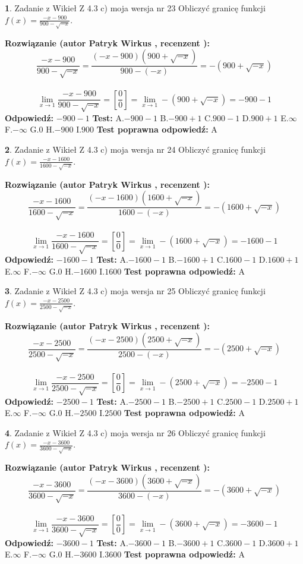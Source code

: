 \documentclass[12pt, a4paper]{article}
\theoremstyle{definition} %
\newtheorem{zad}{}
\newcommand{\zadStart}[1]{\begin{zad}#1\newline}
\newcommand{\zadStop}{\end{zad}}
\newcommand{\rozwStart}[2]{\noindent \textbf{Rozwiązanie (autor #1 , recenzent #2): }\newline}
\newcommand{\rozwStop}{\newline}
\newcommand{\odpStart}{\noindent \textbf{Odpowiedź:}\newline}
\newcommand{\odpStop}{\newline}
\newcommand{\testStart}{\noindent \textbf{Test:}\newline}
\newcommand{\testStop}{\newline}
\newcommand{\kluczStart}{\noindent \textbf{Test poprawna odpowiedź:}\newline}
\newcommand{\kluczStop}{\newline}
\begin{document}
\zadStart{Zadanie z Wikieł Z 4.3 c) moja wersja nr 23}
Obliczyć granicę funkcji $f(x)=\frac{-x-900}{900-\sqrt{-x}}$.
\zadStop
\rozwStart{Patryk Wirkus}{}
$$\frac{-x-900}{900-\sqrt{-x}}=\frac{(-x-900)(900+\sqrt{-x})}{900-(-x)}=-(900+\sqrt{-x})$$
\\
$$\lim\limits_{x\to1}\frac{-x-900}{900-\sqrt{-x}}=[\frac{0}{0}]=\lim\limits_{x\to1}-(900+\sqrt{-x}) =-900-1$$
\rozwStop
\odpStart
$-900-1$
\odpStop
\testStart
A.$-900-1$
B.$-900+1$
C.$900-1$
D.$900+1$
E.$\infty$
F.$-\infty$
G.$0$
H.$-900$
I.$900$
\testStop
\kluczStart
A
\kluczStop



\zadStart{Zadanie z Wikieł Z 4.3 c) moja wersja nr 24}
Obliczyć granicę funkcji $f(x)=\frac{-x-1600}{1600-\sqrt{-x}}$.
\zadStop
\rozwStart{Patryk Wirkus}{}
$$\frac{-x-1600}{1600-\sqrt{-x}}=\frac{(-x-1600)(1600+\sqrt{-x})}{1600-(-x)}=-(1600+\sqrt{-x})$$
\\
$$\lim\limits_{x\to1}\frac{-x-1600}{1600-\sqrt{-x}}=[\frac{0}{0}]=\lim\limits_{x\to1}-(1600+\sqrt{-x}) =-1600-1$$
\rozwStop
\odpStart
$-1600-1$
\odpStop
\testStart
A.$-1600-1$
B.$-1600+1$
C.$1600-1$
D.$1600+1$
E.$\infty$
F.$-\infty$
G.$0$
H.$-1600$
I.$1600$
\testStop
\kluczStart
A
\kluczStop



\zadStart{Zadanie z Wikieł Z 4.3 c) moja wersja nr 25}
Obliczyć granicę funkcji $f(x)=\frac{-x-2500}{2500-\sqrt{-x}}$.
\zadStop
\rozwStart{Patryk Wirkus}{}
$$\frac{-x-2500}{2500-\sqrt{-x}}=\frac{(-x-2500)(2500+\sqrt{-x})}{2500-(-x)}=-(2500+\sqrt{-x})$$
\\
$$\lim\limits_{x\to1}\frac{-x-2500}{2500-\sqrt{-x}}=[\frac{0}{0}]=\lim\limits_{x\to1}-(2500+\sqrt{-x}) =-2500-1$$
\rozwStop
\odpStart
$-2500-1$
\odpStop
\testStart
A.$-2500-1$
B.$-2500+1$
C.$2500-1$
D.$2500+1$
E.$\infty$
F.$-\infty$
G.$0$
H.$-2500$
I.$2500$
\testStop
\kluczStart
A
\kluczStop



\zadStart{Zadanie z Wikieł Z 4.3 c) moja wersja nr 26}
Obliczyć granicę funkcji $f(x)=\frac{-x-3600}{3600-\sqrt{-x}}$.
\zadStop
\rozwStart{Patryk Wirkus}{}
$$\frac{-x-3600}{3600-\sqrt{-x}}=\frac{(-x-3600)(3600+\sqrt{-x})}{3600-(-x)}=-(3600+\sqrt{-x})$$
\\
$$\lim\limits_{x\to1}\frac{-x-3600}{3600-\sqrt{-x}}=[\frac{0}{0}]=\lim\limits_{x\to1}-(3600+\sqrt{-x}) =-3600-1$$
\rozwStop
\odpStart
$-3600-1$
\odpStop
\testStart
A.$-3600-1$
B.$-3600+1$
C.$3600-1$
D.$3600+1$
E.$\infty$
F.$-\infty$
G.$0$
H.$-3600$
I.$3600$
\testStop
\kluczStart
A
\kluczStop
\end{document}
